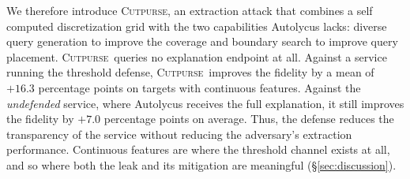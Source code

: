 \documentclass[sigconf,anonymous,review]{acmart}
\newcommand{\sys}{\textsc{Cutpurse}}
\begin{document}
We therefore introduce \sys, an extraction attack that combines a self computed discretization grid with the two capabilities Autolycus lacks: diverse query generation to improve the coverage and boundary search to improve query placement. \sys\ queries no
explanation endpoint at all. Against a service running the threshold defense, \sys\ improves the fidelity by a mean of $+16.3$ percentage points on targets with continuous features. Against the \emph{undefended} service, where Autolycus receives the full explanation, it still improves the fidelity by $+7.0$ percentage points on average. Thus, the defense reduces the transparency of the service without reducing the adversary's extraction performance. Continuous features are where the threshold
channel exists at all, and so where both the leak and its mitigation are meaningful
(\S\ref{sec:discussion}).
\end{document}
